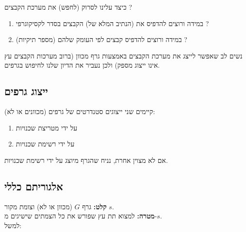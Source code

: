 כיצד עלינו לסרוק (לחפש) את מערכת הקבצים ? 
\begin{enumerate}
\item
במידה ורוצים להדפיס את (הנתיב המלא של) הקבצים בסדר לקסיקוגרפי ?
\item
במידה ורוצים להדפיס קבצים לפי העומק שלהם (מספר תיקיות) ?
\end{enumerate}
נשים לב שאפשר לייצג את מערכת הקבצים באמצעות גרף מכוון (ברוב מערכות הקבצים עץ אינו ייצוג מספק)
ולכן נעביר את הדיון שלנו לחיפוש בגרפים.

\subsection*{ייצוג גרפים}
קיימים שני ייצוגים סטנדרטים של גרפים (מכוונים או לא):
\begin{enumerate}
\item
על ידי מטריצת שכנויות
\item
על ידי רשימת שכנויות
\end{enumerate}
אם לא מצוין אחרת, נניח שהגרף מיוצג על ידי רשימת שכנויות.



\subsection*{אלגוריתם כללי}
\textbf{קלט:}
גרף $G$ (מכוון או לא) וצומת מקור $s$.
\\
\textbf{מטרה:}
למצוא תת עץ שפורש את כל הצמתים שישיגים מ-$s$.
\\
למשל:
\begin{center}
\end{center}

